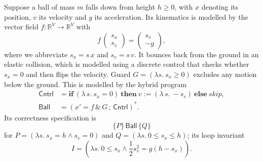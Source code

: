 \documentclass[envcountsame]{llncs}
\newcommand{\IF}[3]{\mathbf{if}\ #1\ \mathbf{then}\ #2\ \mathbf{else}\ #3}
\newcommand{\reals}{\mathbb{R}}
\begin{document}
\begin{example}\label{ex:ball-hoare}
  Suppose a ball of mass $m$ falls down from height $h\geq 0$, with
  $x$ denoting its position, $v$ its velocity and $g$ its
  acceleration. Its kinematics is modelled by the vector field
  $f:\reals^V\to\reals^V$ with
 \begin{equation*}
    f\,
    \begin{pmatrix}
      s_x\\
      s_v
    \end{pmatrix}
=
\begin{pmatrix}
  s_v\\
-g
\end{pmatrix},
\end{equation*}
where we abbreviate
$s_x = s\, x$ and $s_v = s\, v$.  It bounces back
from the ground in an elastic collision, which is modelled using a
discrete control that checks whether $s_x=0$ and then flips the
velocity.  Guard $G=(\lambda s.\ s_x\geq 0)$ excludes any motion
below the ground. This is modelled by the hybrid
program~\cite{Platzer18}
\begin{align*}
	\mathsf{Cntrl} &= \IF {(\lambda\, s.\ s_x=0)} {v:=(\lambda\, s.\ - s_v)} \mathit{skip},\\
	\mathsf{Ball} &= ({x'=f\, \&\, G}\,  {;}\, \mathsf{Cntrl})^\ast.
\end{align*}
Its correctness specification is
\begin{equation*}
\{P\}\, \mathsf{Ball}\, \{Q\}
\end{equation*}
for $P= (\lambda s.\ s_x = h\land s_v = 0)$ and $Q  = (\lambda s.\
0\leq s_x\leq h)$; its loop invariant
\begin{equation*}
      I = \left(\lambda s.\ 0\le s_x \land \frac{1}{2}s_v^2= g(h - s_x)\right).
\end{equation*}


\end{example}
\end{document}
